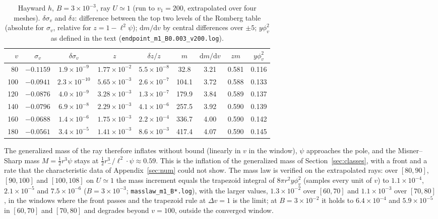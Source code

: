 \documentclass[11pt]{article}
\begin{document}
\begin{table}[ht]\centering\small
\caption{Hayward $h$, $B=3\times10^{-3}$, ray $U\simeq1$ (run to $v_1=200$, extrapolated over four meshes). $\delta\sigma_v$ and $\delta z$: difference between the top two levels of the Romberg table (absolute for $\sigma_v$, relative for $z=1-\ell^{2}\psi$); $\mathrm{d}m/\mathrm{d}v$ by central differences over $\pm5$; $y\phi_v^{2}$ as defined in the text (\texttt{endpoint\_m1\_B0.003\_v200.log}).}\label{tab:front}
\begin{tabular}{rcccccccc}
\toprule
$v$ & $\sigma_v$ & $\delta\sigma_v$ & $z$ & $\delta z/z$ & $m$ & $\mathrm{d}m/\mathrm{d}v$ & $zm$ & $y\phi_v^{2}$\\\midrule
80 & $-0.1159$ & $1.9\!\times\!10^{-9}$ & $1.77\!\times\!10^{-2}$ & $5.5\!\times\!10^{-8}$ & 32.8 & 3.21 & 0.581 & 0.116\\
100 & $-0.0941$ & $2.3\!\times\!10^{-10}$ & $5.65\!\times\!10^{-3}$ & $2.6\!\times\!10^{-7}$ & 104.1 & 3.72 & 0.588 & 0.133\\
120 & $-0.0876$ & $4.0\!\times\!10^{-9}$ & $3.28\!\times\!10^{-3}$ & $1.3\!\times\!10^{-7}$ & 179.9 & 3.84 & 0.589 & 0.137\\
140 & $-0.0796$ & $6.9\!\times\!10^{-8}$ & $2.29\!\times\!10^{-3}$ & $4.1\!\times\!10^{-6}$ & 257.5 & 3.92 & 0.590 & 0.139\\
160 & $-0.0688$ & $1.4\!\times\!10^{-6}$ & $1.75\!\times\!10^{-3}$ & $2.2\!\times\!10^{-4}$ & 336.7 & 4.00 & 0.590 & 0.142\\
180 & $-0.0561$ & $3.4\!\times\!10^{-5}$ & $1.41\!\times\!10^{-3}$ & $8.6\!\times\!10^{-3}$ & 417.4 & 4.07 & 0.590 & 0.145\\\bottomrule
\end{tabular}
\end{table}

The generalized mass of the ray therefore inflates without bound (linearly in $v$ in the window), $\psi$ approaches the pole, and the Misner--Sharp mass $M=\tfrac12r^{3}\psi$ stays at $\tfrac12r_-^{3}/\ell^{2}\cdot\psi\approx0.59$. This is the inflation of the generalized mass of Section~\ref{sec:classes}, with a front and a rate that the characteristic data of Appendix~\ref{sec:num} could not show. The mass law is verified on the extrapolated rays: over $[80,90]$, $[90,100]$ and $[100,108]$ on $U\simeq1$ the mass increment equals the trapezoid integral of $8\pi r^{2}y\phi_v^{2}$ (samples every unit of $v$) to $1.1\times10^{-4}$, $2.1\times10^{-5}$ and $7.5\times10^{-6}$ ($B=3\times10^{-3}$; \texttt{masslaw\_m1\_B*.log}), with the larger values, $1.3\times10^{-2}$ over $[60,70]$ and $1.1\times10^{-3}$ over $[70,80]$, in the windows where the front passes and the trapezoid rule at $\Delta v=1$ is the limit; at $B=3\times10^{-2}$ it holds to $6.4\times10^{-4}$ and $5.9\times10^{-5}$ in $[60,70]$ and $[70,80]$ and degrades beyond $v=100$, outside the converged window.
\end{document}
